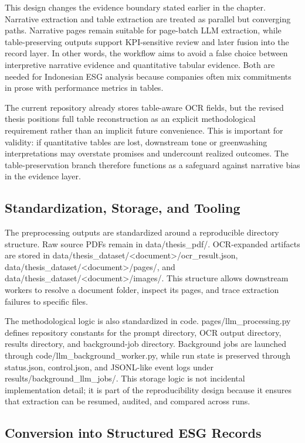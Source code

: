 This design changes the evidence boundary stated earlier in the chapter. Narrative extraction and table extraction are treated as parallel but converging paths. Narrative pages remain suitable for page-batch LLM extraction, while table-preserving outputs support KPI-sensitive review and later fusion into the record layer. In other words, the workflow aims to avoid a false choice between interpretive narrative evidence and quantitative tabular evidence. Both are needed for Indonesian ESG analysis because companies often mix commitments in prose with performance metrics in tables.

The current repository already stores table-aware OCR fields, but the revised thesis positions full table reconstruction as an explicit methodological requirement rather than an implicit future convenience. This is important for validity: if quantitative tables are lost, downstream tone or greenwashing interpretations may overstate promises and undercount realized outcomes. The table-preservation branch therefore functions as a safeguard against narrative bias in the evidence layer.

\subsection{Standardization, Storage, and Tooling}

The preprocessing outputs are standardized around a reproducible directory structure. Raw source PDFs remain in data/thesis\_pdf/. OCR-expanded artifacts are stored in data/thesis\_dataset/<document>/ocr\_result.json, data/thesis\_dataset/<document>/pages/, and data/thesis\_dataset/<document>/images/. This structure allows downstream workers to resolve a document folder, inspect its pages, and trace extraction failures to specific files.

The methodological logic is also standardized in code. pages/llm\_processing.py defines repository constants for the prompt directory, OCR output directory, results directory, and background-job directory. Background jobs are launched through code/llm\_background\_worker.py, while run state is preserved through status.json, control.json, and JSONL-like event logs under results/background\_llm\_jobs/. This storage logic is not incidental implementation detail; it is part of the reproducibility design because it ensures that extraction can be resumed, audited, and compared across runs.

\subsection{Conversion into Structured ESG Records}

